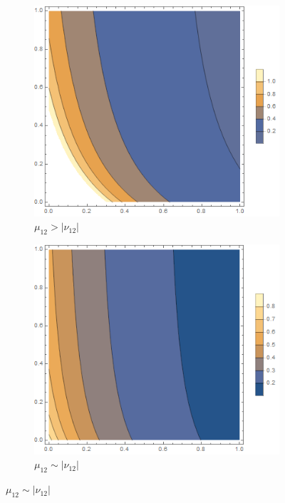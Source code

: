 \documentclass[12pt,a4]{article}
\begin{document}
\begin{figure}[!ht]
	\begin{subfigure}[b]{0.3\textwidth}
		\centering
		\includegraphics[width=\textwidth]{Joonised/Gamma11Mu11Mu22I}
		\caption{$ \mu_{12} > |\nu_{12}| $}
	\end{subfigure}
	\hfill
	\begin{subfigure}[b]{0.3\textwidth}
		\centering
		\includegraphics[width=\textwidth]{Joonised/Gamma11Mu11Mu22II}
		\caption{$ \mu_{12} \sim | \nu_{12}| $}

\end{subfigure}
\end{figure}
\end{document}
